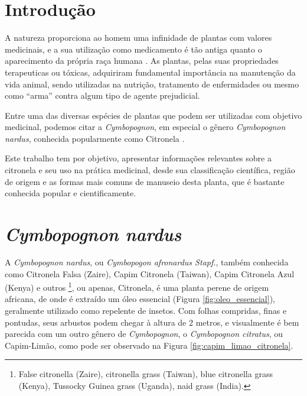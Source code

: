\documentclass[
	article,			%
	11pt,				%
	oneside,			%
	a4paper,			%
	english,			%
	brazil,				%
	]{abntex2}
\begin{document}
\frenchspacing 


\maketitle

\textual

\section*{Introdução}


A natureza proporciona ao homem uma infinidade de plantas com valores medicinais, e a sua utilização como medicamento é tão antiga quanto o aparecimento da própria raça humana \cite{sossae2013}. As plantas, pelas suas propriedades terapeuticas ou tóxicas, adquiriram fundamental importância na manutenção da vida animal, sendo utilizadas na nutrição, tratamento de enfermidades ou mesmo como ``arma'' contra algum tipo de agente prejudicial.

Entre uma das diversas espécies de plantas que podem ser utilizadas com objetivo medicinal, podemos citar a \emph{Cymbopognon}, em especial o gênero \emph{Cymbopognon nardus}, conhecida popularmente como Citronela \cite{fao2013}.

Este trabalho tem por objetivo, apresentar informações relevantes sobre a citronela e seu uso na prática medicinal, desde sua classificação científica, região de origem e as formas mais comuns de manuseio desta planta, que é bastante conhecida popular e cientificamente.

\section{\emph{Cymbopognon nardus}}

A \emph{Cymbopognon nardus}, ou \emph{Cymbopogon afronardus Stapf.}, também conhecida como Citronela Falsa (Zaire), Capim Citronela (Taiwan), Capim Citronela Azul (Kenya) e outros \footnote{False citronella (Zaire), citronella grass (Taiwan), blue citronella grass (Kenya), Tussocky Guinea grass (Uganda), naid grass (India).}, ou apenas, Citronela, é uma planta perene de origem africana, de onde é extraído um óleo essencial (Figura \ref{fig:oleo_essencial}), geralmente utilizado como repelente de insetos. Com folhas compridas, finas e pontudas, seus arbustos podem chegar à altura de 2 metros, e visualmente é bem parecida com um outro gênero de \emph{Cymbopognon}, o \emph{Cymbopognon citratus}, ou Capim-Limão, como pode ser observado na Figura \ref{fig:capim_limao_citronela}.
\end{document}
